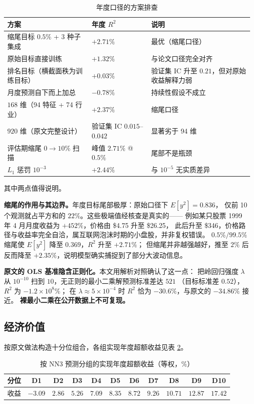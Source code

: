 \documentclass[11pt,a4paper,fontset=windows]{ctexart}
\begin{document}
\begin{table}[htbp]
\centering
\caption{年度口径的方案排查}
\label{tab:ablate}
\small
\begin{tabular}{p{6.4cm}p{3.4cm}p{4.6cm}}
\toprule
方案 & 年度 $R^2$ & 说明 \\
\midrule
缩尾目标 $0.5\%$ + 3 种子集成 & $+2.71\%$ & 最优（缩尾口径） \\
原始目标直接训练 & $+1.32\%$ & 与论文口径完全对齐 \\
排名目标（横截面秩为训练目标） & $+0.03\%$ & 验证集 IC 升至 $0.21$，但对原始收益解释力弱 \\
月度预测自下而上加总 & $-0.78\%$ & 持续性假设不成立 \\
$168$ 维（94 特征 + 74 行业） & $+2.37\%$ & 缩尾口径 \\
$920$ 维（原文完整设计） & 验证集 IC $0.015$--$0.042$ & 显著劣于 94 维 \\
评估期缩尾 $0\to10\%$ 扫描 & 峰值 $2.71\%$ @ $0.5\%$ & 尾部不是瓶颈 \\
$L_1$ 惩罚 $10^{-3}$ & $+2.44\%$ & 与 $10^{-5}$ 无实质差异 \\
\bottomrule
\end{tabular}
\end{table}

其中两点值得说明。

\textbf{缩尾的作用与其边界。}年度目标尾部极厚：原始口径下 $E[y^2] = 0.836$，
仅前 10 个观测就占平方和的 $22\%$。这些极端值经核查是真实的——
例如某只股票 1999 年 4 月月度收益为 $+452\%$，价格由 \$4.75 升至 \$26.25，
此后升至 \$346，价格路径与收益率完全自洽，属互联网泡沫时期的小盘股，并非复权错误。
$0.5\%/99.5\%$ 缩尾使 $E[y^2]$ 降至 $0.369$，$R^2$ 升至 $+2.71\%$；
但缩尾并非越强越好，推至 $2\%$ 后反而降至 $+2.35\%$，说明模型确实捕捉到了部分大波动信息。

\textbf{原文的 OLS 基准隐含正则化。}本文用解析对照确认了这一点：
把岭回归强度 $\lambda$ 从 $10^{-10}$ 扫到 $10$，无正则的最小二乘解预测标准差达 $521$
（目标标准差 $0.52$），$R^2$ 为 $-1.2\times10^{8}\%$；
在 $\lambda \approx 5\times10^{-4}$ 时 $R^2$ 恰为 $-30.6\%$，与原文的 $-34.86\%$ 接近。
\textbf{裸最小二乘在公开数据上不可复现。}

\subsection{经济价值}

按原文做法构造十分位组合，各组实现年度超额收益见表 \ref{tab:decile}。

\begin{table}[htbp]
\centering
\caption{按 NN3 预测分组的实现年度超额收益（等权，\%）}
\label{tab:decile}
\small
\begin{tabular}{lcccccccccc}
\toprule
分位 & D1 & D2 & D3 & D4 & D5 & D6 & D7 & D8 & D9 & D10 \\
\midrule
收益 & $-3.09$ & $2.86$ & $5.26$ & $7.09$ & $8.35$ & $8.72$ & $9.26$ & $10.71$ & $12.87$ & $17.42$ \\
\bottomrule
\end{tabular}
\end{table}
\end{document}
